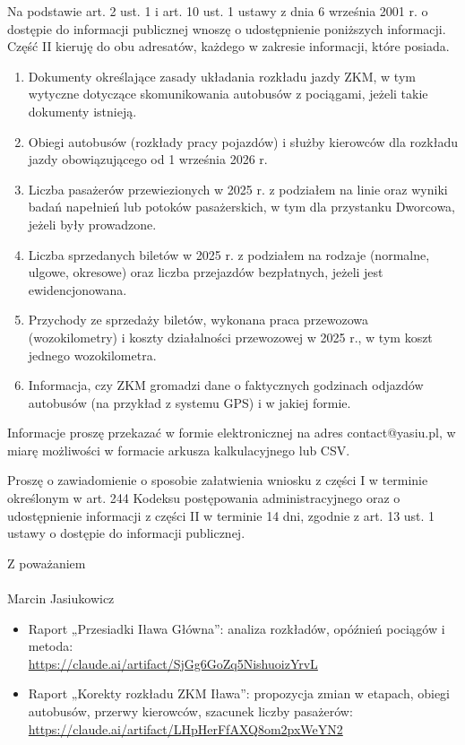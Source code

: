 \documentclass[11pt,a4paper]{article}
\makeatletter
\newcommand{\Nadawca}{Marcin Jasiukowicz}
\newcommand{\EmailNadawcy}{contact@yasiu.pl}
\newcommand{\RaportPrzesiadki}{https://claude.ai/artifact/SjGg6GoZq5NishuoizYrvL}
\newcommand{\RaportKorekty}{https://claude.ai/artifact/LHpHerFfAXQ8om2pxWeYN2}
\newcommand{\Tytul}[1]{\par\smallskip{\bfseries #1}\par}
\makeatother
\begin{document}
Na podstawie art. 2 ust. 1 i art. 10 ust. 1 ustawy z dnia 6 września 2001 r. o dostępie do informacji publicznej wnoszę o udostępnienie poniższych informacji. Część II kieruję do obu adresatów, każdego w zakresie informacji, które posiada.
\begin{enumerate}
\item Dokumenty określające zasady układania rozkładu jazdy ZKM, w tym wytyczne dotyczące skomunikowania autobusów z pociągami, jeżeli takie dokumenty istnieją.
\item Obiegi autobusów (rozkłady pracy pojazdów) i służby kierowców dla rozkładu jazdy obowiązującego od 1 września 2026 r.
\item Liczba pasażerów przewiezionych w 2025 r. z podziałem na linie oraz wyniki badań napełnień lub potoków pasażerskich, w tym dla przystanku Dworcowa, jeżeli były prowadzone.
\item Liczba sprzedanych biletów w 2025 r. z podziałem na rodzaje (normalne, ulgowe, okresowe) oraz liczba przejazdów bezpłatnych, jeżeli jest ewidencjonowana.
\item Przychody ze sprzedaży biletów, wykonana praca przewozowa (wozokilometry) i koszty działalności przewozowej w 2025 r., w tym koszt jednego wozokilometra.
\item Informacja, czy ZKM gromadzi dane o faktycznych godzinach odjazdów autobusów (na przykład z systemu GPS) i w jakiej formie.
\end{enumerate}

Informacje proszę przekazać w formie elektronicznej na adres \EmailNadawcy, w miarę możliwości w formacie arkusza kalkulacyjnego lub CSV.

Proszę o zawiadomienie o sposobie załatwienia wniosku z części I w terminie określonym w art. 244 Kodeksu postępowania administracyjnego oraz o udostępnienie informacji z części II w terminie 14 dni, zgodnie z art. 13 ust. 1 ustawy o dostępie do informacji publicznej.

\vspace{0.8cm}
\hfill\begin{minipage}{0.42\textwidth}\centering
Z poważaniem\\[1.4cm]
\makebox[5.5cm]{\dotfill}\\
\Nadawca
\end{minipage}

\Tytul{Materiały}
\begin{itemize}
\item Raport „Przesiadki Iława Główna”: analiza rozkładów, opóźnień pociągów i metoda:\\ \url{\RaportPrzesiadki}
\item Raport „Korekty rozkładu ZKM Iława”: propozycja zmian w etapach, obiegi autobusów, przerwy kierowców, szacunek liczby pasażerów:\\ \url{\RaportKorekty}
\end{itemize}
\end{document}
